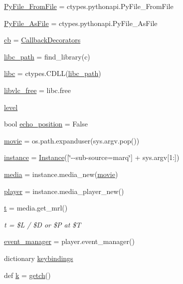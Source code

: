 \begin{DoxyCompactItemize}
\item 
\hyperlink{namespacevlc_a19ea06542f07b72fac5ee1e04a56cc83}{Py\+File\+\_\+\+From\+File} = ctypes.\+pythonapi.\+Py\+File\+\_\+\+From\+File
\item 
\hyperlink{namespacevlc_ab2062f3cf434a12c9ea8c111c5ea6b9b}{Py\+File\+\_\+\+As\+File} = ctypes.\+pythonapi.\+Py\+File\+\_\+\+As\+File
\item 
\hyperlink{namespacevlc_a48994b0a618061e8aa4b2d314712d3da}{cb} = \hyperlink{classvlc_1_1_callback_decorators}{Callback\+Decorators}
\item 
\hyperlink{namespacevlc_a7469cfb80443db78c5bf2aaea5ba2f15}{libc\+\_\+path} = find\+\_\+library(\textquotesingle{}c\textquotesingle{})
\item 
\hyperlink{namespacevlc_a23b02f3fc0fc2663e64b4d51b19ebb56}{libc} = ctypes.\+C\+D\+LL(\hyperlink{namespacevlc_a7469cfb80443db78c5bf2aaea5ba2f15}{libc\+\_\+path})
\item 
\hyperlink{namespacevlc_aa77795730bdcb92194198c19c0fb0274}{libvlc\+\_\+free} = libc.\+free
\item 
\hyperlink{namespacevlc_afde8e18a788ccc92fc61cab298bca7e3}{level}
\item 
bool \hyperlink{namespacevlc_a65d3edd39984571c052e38ddc4455267}{echo\+\_\+position} = False
\item 
\hyperlink{namespacevlc_ae484bbb4e2af6e2c896075fdb5c69e3e}{movie} = os.\+path.\+expanduser(sys.\+argv.\+pop())
\item 
\hyperlink{namespacevlc_a5ffaf17e178b3a6fa2012fe3050ede22}{instance} = \hyperlink{classvlc_1_1_instance}{Instance}(\mbox{[}\char`\"{}-\/-\/sub-\/source=marq\char`\"{}\mbox{]} + sys.\+argv\mbox{[}1\+:\mbox{]})
\item 
\hyperlink{namespacevlc_a4ad19ab45fc97cae6d0da6365a6a08a4}{media} = instance.\+media\+\_\+new(\hyperlink{namespacevlc_ae484bbb4e2af6e2c896075fdb5c69e3e}{movie})
\item 
\hyperlink{namespacevlc_a46afbb77ee4b53026dff7b4f65384dc4}{player} = instance.\+media\+\_\+player\+\_\+new()
\item 
\hyperlink{namespacevlc_ad64bbe5580664e0978bbe69a4b7abb1e}{t} = media.\+get\+\_\+mrl()
\begin{DoxyCompactList}\small\item\em t = \textquotesingle{}\$L / \$D or \$P at \$T\textquotesingle{} \end{DoxyCompactList}\item 
\hyperlink{namespacevlc_af1c54e30e2e3ab4f89adf23ede0db23e}{event\+\_\+manager} = player.\+event\+\_\+manager()
\item 
dictionary \hyperlink{namespacevlc_a3540c8e41ef509a65a719ad6b7e5261c}{keybindings}
\item 
def \hyperlink{namespacevlc_a1abc95f8cbff85a4001af40c469444e6}{k} = \hyperlink{namespacevlc_a26c66231b8919b9ec0736a57bab415b9}{getch}()
\end{DoxyCompactItemize}


